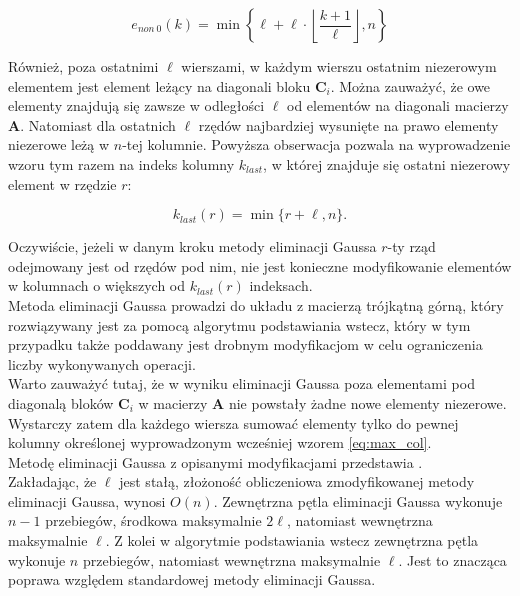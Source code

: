 \documentclass{mk-polish-lab-report}
\newcommand{\mA}{\bm{A}}
\newcommand{\mC}{\bm{C}}
\begin{document}
\begin{equation}
e_{non~0}(k) = \min\left\lbrace\ell + \ell \cdot \left \lfloor\frac{k + 1}{\ell}\right \rfloor, n\right\rbrace
\end{equation}

\noindent Również, poza ostatnimi $\ell$ wierszami, w każdym wierszu ostatnim niezerowym elementem jest element leżący na diagonali bloku $\mC_i$. Można zauważyć, że owe elementy znajdują się zawsze w odległości $\ell$ od elementów na diagonali macierzy $\mA$. Natomiast dla ostatnich $\ell$ rzędów najbardziej wysunięte na prawo elementy niezerowe leżą w $n$-tej kolumnie. Powyższa obserwacja pozwala na wyprowadzenie wzoru tym razem na indeks kolumny $k_{last}$, w której znajduje się ostatni niezerowy element w rzędzie $r$:

\begin{equation}
k_{last}(r) = \min\{r + \ell, n\}.
\label{eq:max_col}
\end{equation}

\noindent Oczywiście, jeżeli w danym kroku metody eliminacji Gaussa $r$-ty rząd odejmowany jest od rzędów pod nim, nie jest konieczne modyfikowanie elementów w kolumnach o większych od $k_{last}(r)$ indeksach. \\

\noindent Metoda eliminacji Gaussa prowadzi do układu z macierzą trójkątną górną, który rozwiązywany jest za pomocą algorytmu podstawiania wstecz, który w tym przypadku także poddawany jest drobnym modyfikacjom w celu ograniczenia liczby wykonywanych operacji. \\

\noindent Warto zauważyć tutaj, że w wyniku eliminacji Gaussa poza elementami pod diagonalą bloków $\mC_i$ w macierzy $\mA$ nie powstały żadne nowe elementy niezerowe. Wystarczy zatem dla każdego wiersza sumować elementy tylko do pewnej kolumny określonej wyprowadzonym wcześniej wzorem \eqref{eq:max_col}. \\

\noindent Metodę eliminacji Gaussa z opisanymi modyfikacjami przedstawia . \\

\noindent Zakładając, że $\ell$ jest stałą, złożoność obliczeniowa zmodyfikowanej metody eliminacji Gaussa, wynosi $O(n)$. Zewnętrzna pętla eliminacji Gaussa wykonuje $n-1$ przebiegów, środkowa maksymalnie $2\ell$, natomiast wewnętrzna maksymalnie $\ell$. Z kolei w algorytmie podstawiania wstecz zewnętrzna pętla wykonuje $n$ przebiegów, natomiast wewnętrzna maksymalnie $\ell$. Jest to znacząca poprawa względem standardowej metody eliminacji Gaussa.
\end{document}
